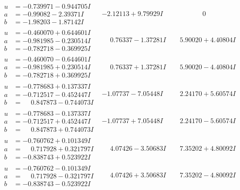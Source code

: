 \documentclass[1p]{elsarticle_modified}
\theoremstyle{definition}
\begin{document}
$$\begin{array}{c|c|c}
\begin{aligned}
u &= -0.739971 - 0.944705 I \\
a &= -0.99082 - 2.39371 I \\
b &= -1.98203 - 1.87142 I\end{aligned}
 & -2.12113 + 9.79929 I & \phantom{-0.000000 } 0 \\ \hline\begin{aligned}
u &= -0.460070 + 0.644601 I \\
a &= -0.981985 - 0.230514 I \\
b &= -0.782718 - 0.369925 I\end{aligned}
 & \phantom{-}0.76337 - 1.37281 I & \phantom{-}5.90020 + 4.40804 I \\ \hline\begin{aligned}
u &= -0.460070 - 0.644601 I \\
a &= -0.981985 + 0.230514 I \\
b &= -0.782718 + 0.369925 I\end{aligned}
 & \phantom{-}0.76337 + 1.37281 I & \phantom{-}5.90020 - 4.40804 I \\ \hline\begin{aligned}
u &= -0.778683 + 0.137337 I \\
a &= -0.712517 - 0.452447 I \\
b &= \phantom{-}0.847873 - 0.744073 I\end{aligned}
 & -1.07737 - 7.05448 I & \phantom{-}2.24170 + 5.60574 I \\ \hline\begin{aligned}
u &= -0.778683 - 0.137337 I \\
a &= -0.712517 + 0.452447 I \\
b &= \phantom{-}0.847873 + 0.744073 I\end{aligned}
 & -1.07737 + 7.05448 I & \phantom{-}2.24170 - 5.60574 I \\ \hline\begin{aligned}
u &= -0.760762 + 0.101349 I \\
a &= \phantom{-}0.717928 + 0.321797 I \\
b &= -0.838743 + 0.523922 I\end{aligned}
 & \phantom{-}4.07426 - 3.50683 I & \phantom{-}7.35202 + 4.80092 I \\ \hline\begin{aligned}
u &= -0.760762 - 0.101349 I \\
a &= \phantom{-}0.717928 - 0.321797 I \\
b &= -0.838743 - 0.523922 I\end{aligned}
 & \phantom{-}4.07426 + 3.50683 I & \phantom{-}7.35202 - 4.80092 I\\

\end{array}$$
\end{document}
